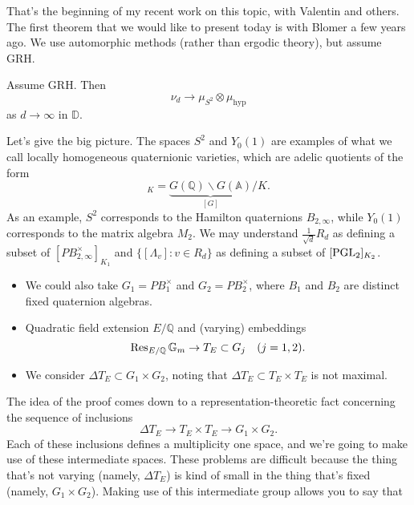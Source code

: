 \documentclass[reqno]{amsart} 
\begin{document}
That's the beginning of my recent work on this topic, with Valentin and others.  The first theorem that we would like to present today is with Blomer a few years ago.  We use automorphic methods (rather than ergodic theory), but assume GRH.
\begin{theorem}[B--Blomer]
  Assume GRH.  Then
  \begin{equation*}
    \nu_d \rightarrow \mu_{S^2 } \otimes \mu_{\mathrm{hyp}}
  \end{equation*}
  as $d \rightarrow \infty $ in $\mathbb{D} $.
\end{theorem}
Let's give the big picture.  The spaces $S^2 $ and $Y_0 (1) $ are examples of what we call locally homogeneous quaternionic varieties, which are adelic quotients of the form
\begin{equation*} [G]_K = \underbrace { G (\mathbb{Q} ) \backslash G (\mathbb{A} ) }_{ [G] } / K.
\end{equation*}
As an example, $S^2 $ corresponds to the Hamilton quaternions $B_{2, \infty }$, while $Y_0(1)$ corresponds to the matrix algebra $M_2$.  We may understand $\frac{1}{\sqrt{d}} R_d$ as defining a subset of $[ PB_{2,\infty}^\times]_{K_1}$ and $\{[\Lambda_v] : v \in R_d\}$ as defining a subset of $[\operatorname{PGL}_2]_{K_2}$.
\begin{itemize}
\item We could also take $G_1 = P B_1^\times $ and $G_2 = P B_2^\times $, where $B_1$ and $B_2$ are distinct fixed quaternion algebras.
\item Quadratic field extension $E/\mathbb{Q}$ and (varying) embeddings
  \begin{equation*}
    \operatorname{Res}_{E / \mathbb{Q} } \mathbb{G}_m \rightarrow T_E \subset G_j \quad (j=1,2).
  \end{equation*}
\item We consider $\Delta T_E \subset G_1 \times G_2 $, noting that $\Delta T_E \subset T_E \times T_E $ is not maximal.
\end{itemize}
The idea of the proof comes down to a representation-theoretic fact concerning the sequence of inclusions
\begin{equation*}
  \Delta T_E \rightarrow T_E \times T_E \rightarrow G_1 \times G_2.
\end{equation*}
Each of these inclusions defines a multiplicity one space, and we're going to make use of these intermediate spaces.  These problems are difficult because the thing that's not varying (namely, $\Delta T_E $) is kind of small in the thing that's fixed (namely, $G_1 \times G_2 $).  Making use of this intermediate group allows you to say that
\end{document}
